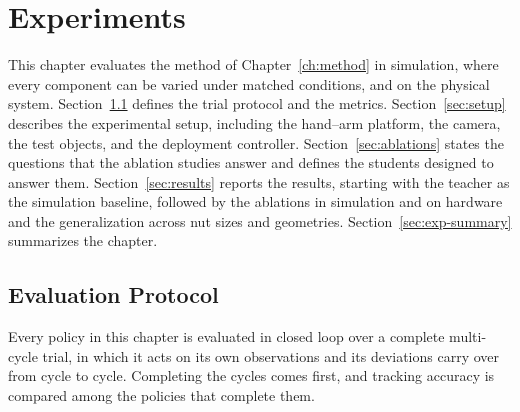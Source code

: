\chapter{Experiments}\label{ch:experiments}%

This chapter evaluates the method of Chapter~\ref{ch:method} in simulation, where every component can be varied under matched conditions, and on the physical system. Section~\ref{sec:evaluation} defines the trial protocol and the metrics. Section~\ref{sec:setup} describes the experimental setup, including the hand--arm platform, the camera, the test objects, and the deployment controller. Section~\ref{sec:ablations} states the questions that the ablation studies answer and defines the students designed to answer them. Section~\ref{sec:results} reports the results, starting with the teacher as the simulation baseline, followed by the ablations in simulation and on hardware and the generalization across nut sizes and geometries. Section~\ref{sec:exp-summary} summarizes the chapter.

\section{Evaluation Protocol}\label{sec:evaluation}

Every policy in this chapter is evaluated in closed loop over a complete multi-cycle trial, in which it acts on its own observations and its deviations carry over from cycle to cycle. Completing the cycles comes first, and tracking accuracy is compared among the policies that complete them.


